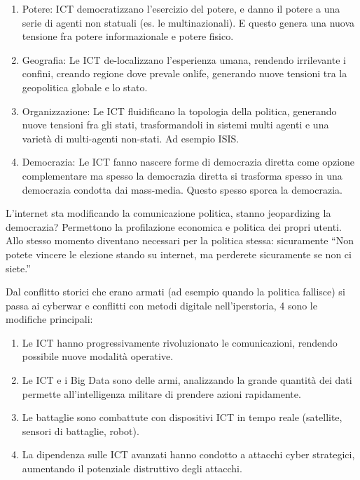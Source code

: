\documentclass[a4page, 11pt]{article}
\begin{document}
\begin{enumerate}
	\def\labelenumi{\arabic{enumi})}
	 
	\item
	Potere: ICT democratizzano l'esercizio del potere, e danno il potere a
	una serie di agenti non statuali (es. le multinazionali). E questo
	genera una nuova tensione fra potere informazionale e potere fisico.
	\item
	Geografia: Le ICT de-localizzano l'esperienza umana, rendendo
	irrilevante i confini, creando regione dove prevale onlife, generando
	nuove tensioni tra la geopolitica globale e lo stato.
	\item
	Organizzazione: Le ICT fluidificano la topologia della politica,
	generando nuove tensioni fra gli stati, trasformandoli in sistemi
	multi agenti e una varietà di multi-agenti non-stati. Ad esempio ISIS.
	\item
	Democrazia: Le ICT fanno nascere forme di democrazia diretta come
	opzione complementare ma spesso la democrazia diretta si trasforma
	spesso in una democrazia condotta dai mass-media. Questo spesso sporca
	la democrazia.
\end{enumerate}

L'internet sta modificando la comunicazione politica, stanno
jeopardizing la democrazia? Permettono la profilazione economica e
politica dei propri utenti. Allo stesso momento diventano necessari per
la politica stessa: sicuramente ``Non potete vincere le elezione stando
su internet, ma perderete sicuramente se non ci siete.''

Dal conflitto storici che erano armati (ad esempio quando la politica
fallisce) si passa ai cyberwar e conflitti con metodi digitale
nell'iperstoria, 4 sono le modifiche principali:

\begin{enumerate}
	\def\labelenumi{\arabic{enumi})}
	 
	\item
	Le ICT hanno progressivamente rivoluzionato le comunicazioni, rendendo
	possibile nuove modalità operative.
	\item
	Le ICT e i Big Data sono delle armi, analizzando la grande quantità
	dei dati permette all'intelligenza militare di prendere azioni
	rapidamente.
	\item
	Le battaglie sono combattute con dispositivi ICT in tempo reale
	(satellite, sensori di battaglie, robot).
	\item
	La dipendenza sulle ICT avanzati hanno condotto a attacchi cyber
	strategici, aumentando il potenziale distruttivo degli attacchi.
\end{enumerate}
\end{document}
